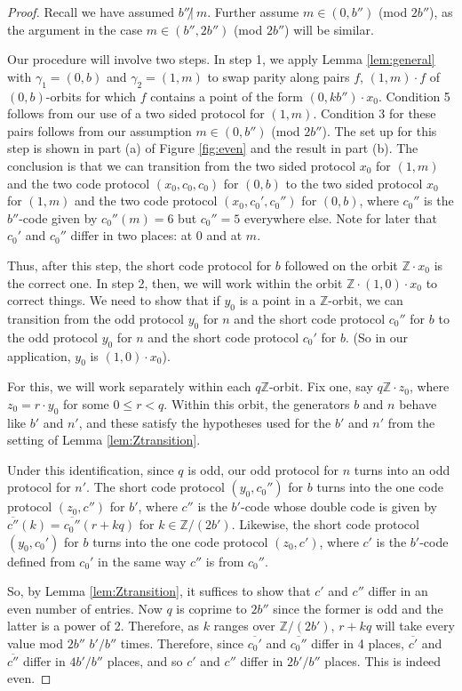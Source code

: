 \documentclass[12pt]{article}
\newcommand{\0}{\varnothing}
\newcommand{\Z}{\mathbb{Z}}
\begin{document}
\begin{proof}
Recall we have assumed $b'' \not|\ m$. Further assume $m \in (0,b'')$ (mod $2b''$), as the argument in the case $m \in (b'',2b'')$ (mod $2b''$) will be similar.

Our procedure will involve two steps. In step 1, we apply Lemma \ref{lem:general} with $\gamma_1 = (0,b)$ and $\gamma_2 = (1,m)$ to swap parity along pairs $f$, $(1,m) \cdot f$ of $(0,b)$-orbits for which $f$ contains a point of the form $(0,kb'') \cdot x_0$. Condition 5 follows from our use of a two sided protocol for $(1,m)$. Condition 3 for these pairs follows from our assumption $m \in (0,b'')$ (mod $2b''$). The set up for this step is shown in part (a) of Figure \ref{fig:even} and the result in part (b). The conclusion is that we can transition from the two sided protocol $x_0$ for $(1,m)$ and the two code protocol $(x_0,c_0,c_0)$ for $(0,b)$ to the two sided protocol $x_0$ for $(1,m)$ and the two code protocol $(x_0,c_0',c_0'')$ for $(0,b)$, where $c_0''$ is the $b''$-code given by $c_0''(m) = 6$ but $c_0'' = 5$ everywhere else. Note for later that $c_0'$ and $c_0''$ differ in two places: at 0 and at $m$.

Thus, after this step, the short code protocol for $b$ followed on the orbit $\Z \cdot x_0$ is the correct one. In step 2, then, we will work within the orbit $\Z \cdot (1,0) \cdot x_0$ to correct things. We need to show that if $y_0$ is a point in a $\Z$-orbit, we can transition from the odd protocol $y_0$ for $n$ and the short code protocol $c_0''$ for $b$ to the odd protocol $y_0$ for $n$ and the short code protocol $c_0'$ for $b$. (So in our application, $y_0$ is $(1,0) \cdot x_0$). 

For this, we will work separately within each $q\Z$-orbit. Fix one, say $q\Z \cdot z_0$, where $z_0 = r \cdot y_0$ for some $0 \leq r < q$. Within this orbit, the generators $b$ and $n$ behave like $b'$ and $n'$, and these satisfy the hypotheses used for the $b'$ and $n'$ from the setting of Lemma \ref{lem:Ztransition}. 

Under this identification, since $q$ is odd, our odd protocol for $n$ turns into an odd protocol for $n'$. The short code protocol $(y_0,c_0'')$ for $b$ turns into the one code protocol $(z_0,c'')$ for $b'$, where $c''$ is the $b'$-code whose double code is given by $\overline{c''}(k) = \overline{c_0''}(r+kq)$ for $k \in \Z/(2b')$. Likewise, the short code protocol $(y_0,c_0')$ for $b$ turns into the one code protocol $(z_0,c')$, where $c'$ is the $b'$-code defined from $c_0'$ in the same way $c''$ is from $c_0''$.

So, by Lemma \ref{lem:Ztransition}, it suffices to show that $c'$ and $c''$ differ in an even number of entries. Now $q$ is coprime to $2b''$ since the former is odd and the latter is a power of 2. Therefore, as $k$ ranges over $\Z/(2b')$, $r+kq$ will take every value mod $2b''$ $b'/b''$ times. Therefore, since $\overline{c_0'}$ and $\overline{c_0''}$ differ in 4 places, $\overline{c'}$ and $\overline{c''}$ differ in $4b'/b''$ places, and so $c'$ and $c''$ differ in $2b'/b''$ places. This is indeed even.
\end{proof}
\end{document}
